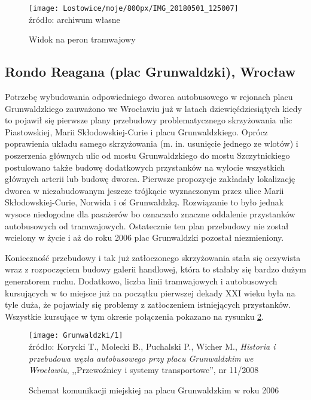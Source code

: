 \documentclass[twoside,12pt]{article}
\begin{document}
		\begin{figure}[H]
		\centering
		\caption{Widok na peron tramwajowy}
		\texttt{[image: Lostowice/moje/800px/IMG\_20180501\_125007]}\\
		\footnotesize{źródło: archiwum własne}
		\label{lostowice4}
	\end{figure}
	
	\clearpage
	\subsection{Rondo Reagana (plac Grunwaldzki), Wrocław}
	
	Potrzebę wybudowania odpowiedniego dworca autobusowego w rejonach placu Grunwaldzkiego zauważono we Wrocławiu już w latach dziewięćdziesiątych kiedy to pojawił się pierwsze plany przebudowy problematycznego skrzyżowania ulic Piastowskiej, Marii Skłodowskiej-Curie i placu Grunwaldzkiego. Oprócz poprawienia układu samego skrzyżowania (m. in. usunięcie jednego ze wlotów) i poszerzenia głównych ulic od mostu Grunwaldzkiego do mostu Szczytnickiego postulowano także budowę dodatkowych przystanków na wylocie wszystkich głównych arterii lub budowę dworca. Pierwsze propozycje zakładały lokalizację dworca w niezabudowanym jeszcze trójkącie wyznaczonym przez ulice Marii Skłodowskiej-Curie, Norwida i oś Grunwaldzką. Rozwiązanie to było jednak wysoce niedogodne dla pasażerów bo oznaczało znaczne oddalenie przystanków autobusowych od tramwajowych. Ostatecznie ten plan przebudowy nie został wcielony w życie i aż do roku 2006 plac Grunwaldzki pozostał niezmieniony. 
	
	Konieczność przebudowy i tak już zatłoczonego skrzyżowania stała się oczywista wraz z rozpoczęciem budowy galerii handlowej, która to stałaby się bardzo dużym generatorem ruchu. Dodatkowo, liczba linii tramwajowych i autobusowych kursujących w to miejsce już na początku pierwszej dekady XXI wieku była na tyle duża, że pojawiały się problemy z zatłoczeniem istniejących przystanków. Wszystkie kursujące w tym okresie połączenia pokazano na rysunku \ref{grunwaldzki1}.
	
	\begin{figure}[H]
		\centering
		\caption{Schemat komunikacji miejskiej na placu Grunwaldzkim w roku 2006}
		\texttt{[image: Grunwaldzki/1]}\\
		\footnotesize{źródło: Korycki T., Molecki B., Puchalski P., Wicher M., \emph{Historia i przebudowa węzła autobusowego przy placu Grunwaldzkim we Wrocławiu}, ,,Przewoźnicy i systemy transportowe'', nr 11/2008 \cite{grunwaldzki1}}
		\label{grunwaldzki1}
	\end{figure}
	
\end{document}
